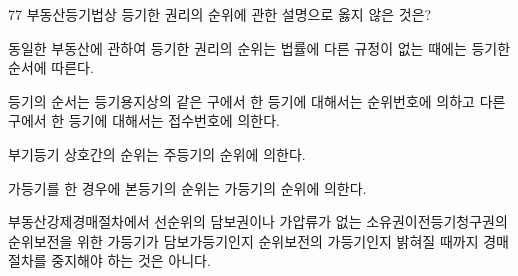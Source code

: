 \begin{question}{77}
부동산등기법상 등기한 권리의 순위에 관한 설명으로 옳지 않은 것은?
\begin{choices}
  \item 동일한 부동산에 관하여 등기한 권리의 순위는 법률에 다른 규정이 없는 때에는 등기한 순서에 따른다.
  \item 등기의 순서는 등기용지상의 같은 구에서 한 등기에 대해서는 순위번호에 의하고 다른 구에서 한 등기에 대해서는 접수번호에 의한다.
  \item 부기등기 상호간의 순위는 주등기의 순위에 의한다.
  \item 가등기를 한 경우에 본등기의 순위는 가등기의 순위에 의한다.
  \item 부동산강제경매절차에서 선순위의 담보권이나 가압류가 없는 소유권이전등기청구권의 순위보전을 위한 가등기가 담보가등기인지 순위보전의 가등기인지 밝혀질 때까지 경매절차를 중지해야 하는 것은 아니다.
\end{choices}
\end{question}
